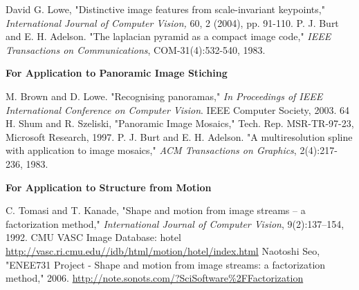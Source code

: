 \documentclass[article,oneside]{memoir}
\begin{document}
 \begin{thebibliography}{99}

David G. Lowe, "Distinctive image features from scale-invariant keypoints," \textit{International Journal of Computer Vision,} 60, 2 (2004), pp. 91-110.
 P. J. Burt and E. H. Adelson. "The laplacian pyramid as a compact image code," \textit{IEEE Transactions on Communications}, COM-31(4):532-540, 1983.

\textbf{For Application to Panoramic Image Stiching}

 M. Brown and D. Lowe. "Recognising panoramas," \textit{In Proceedings of IEEE International Conference on Computer Vision}. IEEE Computer Society, 2003. 64
 H. Shum and R. Szeliski, "Panoramic Image Mosaics," Tech. Rep. MSR-TR-97-23, Microsoft Research, 1997.
 P. J. Burt and E. H. Adelson. "A multiresolution spline with application to image mosaics," \textit{ACM Transactions on Graphics}, 2(4):217-236, 1983.  

\textbf{For Application to Structure from Motion}

  C. Tomasi and T. Kanade, "Shape and motion from image streams -- a factorization method,"   \textit{International Journal of Computer Vision}, 9(2):137--154, 1992. 
 CMU VASC Image Database: hotel \url{http://vasc.ri.cmu.edu//idb/html/motion/hotel/index.html}
 Naotoshi Seo, "ENEE731 Project - Shape and motion from image streams: a factorization method," 2006. \url{http://note.sonots.com/?SciSoftware%2FFactorization}

\end{thebibliography}
\end{document}
